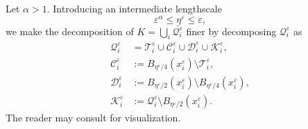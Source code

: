 \documentclass[11pt,a4paper]{article}
\numberwithin{equation}{section}
\newcommand{\eps}{\varepsilon}
\begin{document}
Let $\alpha>1$. Introducing an intermediate lengthscale 
\begin{equation}\label{lengthscale}
    \eps^\alpha \le \eta^\eps \le \eps, 
\end{equation}
we make the decomposition of $K = \bigcup_i \overline{\mathcal{Q}^\eps_i}$ finer by decomposing $\mathcal{Q}^\eps_i$ as
\[
    \begin{split}
    \mathcal{Q}^\eps_i 
    &= \mathcal{T}^\eps_i 
    \cup \mathcal{C}^\eps_i 
    \cup \mathcal{D}^\eps_i 
    \cup \mathcal{K}^\eps_i, \\
    \mathcal{C}^\eps_i 
    &:= B_{\eta^\eps/4}(x^\eps_i) \setminus \mathcal{T}^\eps_i, \\
    \mathcal{D}^\eps_i 
    &:= B_{\eta^\eps/2}(x^\eps_i) \setminus B_{\eta^\eps/4}(x^\eps_i), \\
    \mathcal{K}^\eps_i 
    &:= \mathcal{Q}^\eps_i \setminus B_{\eta^\eps/2}(x^\eps_i).
    \end{split}
\]
The reader may consult \cite[Figure 2]{Hof23} for visualization. 
\end{document}
